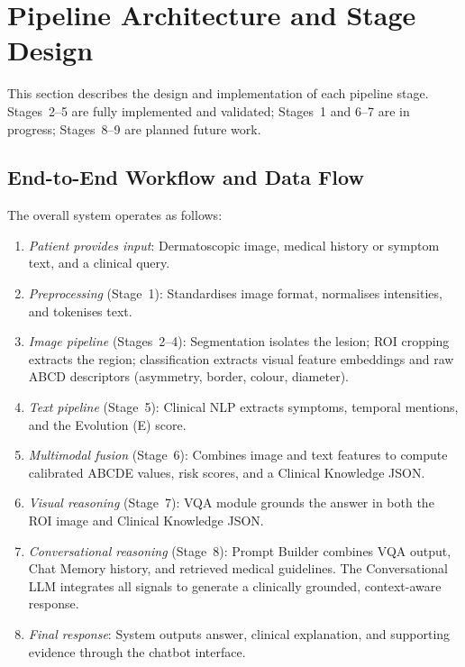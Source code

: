 \documentclass[conference]{IEEEtran}
\begin{document}
\section{Pipeline Architecture and Stage Design}

This section describes the design and implementation of each pipeline
stage. Stages~2--5 are fully implemented and validated; Stages~1 and
6--7 are in progress; Stages~8--9 are planned future work.

\subsection{End-to-End Workflow and Data Flow}

The overall system operates as follows:

\begin{enumerate}[leftmargin=*]
    \item \emph{Patient provides input}: Dermatoscopic image, medical history or
          symptom text, and a clinical query.
    \item \emph{Preprocessing} (Stage~1): Standardises image format, normalises
          intensities, and tokenises text.
    \item \emph{Image pipeline} (Stages~2--4): Segmentation isolates the lesion;
          ROI cropping extracts the region; classification extracts visual feature
          embeddings and raw ABCD descriptors (asymmetry, border, colour, diameter).
    \item \emph{Text pipeline} (Stage~5): Clinical NLP extracts symptoms, temporal
          mentions, and the Evolution (E) score.
    \item \emph{Multimodal fusion} (Stage~6): Combines image and text features to
          compute calibrated ABCDE values, risk scores, and a Clinical Knowledge JSON.
    \item \emph{Visual reasoning} (Stage~7): VQA module grounds the answer in both
          the ROI image and Clinical Knowledge JSON.
    \item \emph{Conversational reasoning} (Stage~8): Prompt Builder combines VQA
          output, Chat Memory history, and retrieved medical guidelines. The
          Conversational LLM integrates all signals to generate a clinically
          grounded, context-aware response.
    \item \emph{Final response}: System outputs answer, clinical explanation, and
          supporting evidence through the chatbot interface.
\end{enumerate}
\end{document}
